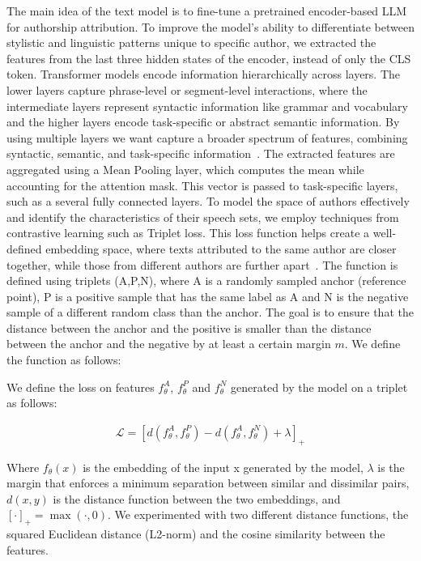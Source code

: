 \documentclass{Interspeech}
\begin{document}
The main idea of the text model is to fine-tune a pretrained encoder-based LLM
for authorship attribution. To improve the model's ability to differentiate
between stylistic and linguistic patterns unique to specific author, we
extracted the features from the last three hidden states of the encoder,
instead of only the CLS token. Transformer models encode information
hierarchically across layers. The lower layers capture phrase-level or
segment-level interactions, where the intermediate layers represent syntactic
information like grammar and vocabulary and the higher layers encode
task-specific or abstract semantic information. By using multiple layers we
want capture a broader spectrum of features, combining syntactic, semantic, and
task-specific information~\cite{jawahar2019does}. The extracted features are
aggregated using a Mean Pooling layer, which computes the mean while accounting
for the attention mask. This vector is passed to task-specific layers, such as
a several fully connected layers. To model the space of authors effectively and
identify the characteristics of their speech sets, we employ techniques from
contrastive learning such as Triplet loss. This loss function helps create a
well-defined embedding space, where texts attributed to the same author are
closer together, while those from different authors are further
apart~\cite{mao2019metric}. The function is defined using triplets (A,P,N),
where A is a randomly sampled anchor (reference point), P is a positive sample
that has the same label as A and N is the negative sample of a different random
class than the anchor. The goal is to ensure that the distance between the
anchor and the positive is smaller than the distance between the anchor and the
negative by at least a certain margin $m$. We define the function as follows:

We define the loss on features $f_\theta^{A}$, $f_\theta^{P}$ and $f_\theta^{N}$ generated by the model on a triplet as follows:

\begin{align}
  \mathcal{L} = [d(f_\theta^{A},f_\theta^{P}) - d(f_\theta^{A},f_\theta^{N}) + \lambda]_{+}
  \label{eq:triplet_loss}
\end{align}


Where $f_\theta(x)$ is the embedding of the input x generated by the model,
$\lambda$ is the margin that enforces a minimum separation between similar and
dissimilar pairs, $d(x,y)$ is the distance function between the two embeddings,
and $[\cdot]_{+} = \max(\cdot, 0)$. We experimented with two different distance
functions, the squared Euclidean distance (L2-norm) and the cosine similarity
between the features.
\end{document}
